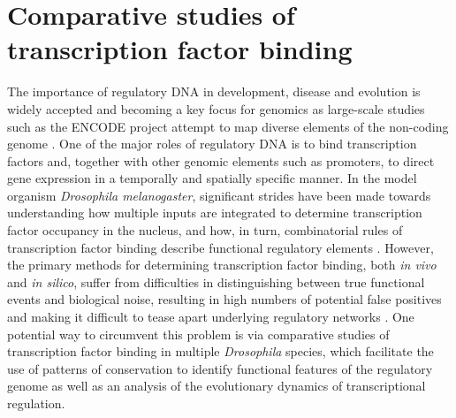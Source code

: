 \section{Comparative studies of transcription factor binding}
The importance of regulatory DNA in development, disease and evolution is widely accepted and becoming a key focus for genomics as large-scale studies such as the ENCODE project attempt to map diverse elements of the non-coding genome \citep{dunham_integrated_2012,gordon_tempo_2012,neph_expansive_2012,wray_evolutionary_2007}. One of the major roles of regulatory DNA is to bind transcription factors and, together with other genomic elements such as promoters, to direct gene expression in a temporally and spatially specific manner. In the model organism \emph{Drosophila melanogaster}, significant strides have been made towards understanding how multiple inputs are integrated to determine transcription factor occupancy in the nucleus, and how, in turn, combinatorial rules of transcription factor binding describe functional regulatory elements \citep{kaplan_quantitative_2011,li_role_2011,zinzen_combinatorial_2009}. However, the primary methods for determining transcription factor binding, both \emph{in vivo} and \emph{in silico}, suffer from difficulties in distinguishing between true functional events and biological noise, resulting in high numbers of potential false positives and making it difficult to tease apart underlying regulatory networks \citep{biggin_animal_2011,fisher_dna_2012,macarthur_developmental_2009}. One potential way to circumvent this problem is via comparative studies of transcription factor binding in multiple \emph{Drosophila} species, which facilitate the use of patterns of conservation to identify functional features of the regulatory genome as well as an analysis of the evolutionary dynamics of transcriptional regulation.

